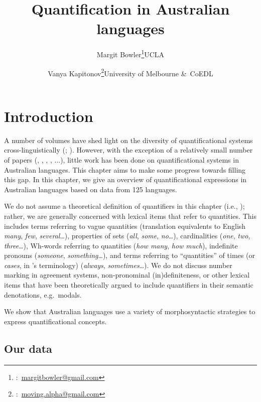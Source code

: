 \documentclass[12pt,egregdoesnotlikesansseriftitles]{scrartcl}
\title{Quantification in Australian languages}
\author{Margit Bowler\thanks{\Letter:~\href{mailto:margitbowler@gmail.com}{margitbowler@gmail.com}}\authorcr UCLA \and \vspace{-.5cm}Vanya Kapitonov\thanks{\Letter:~\href{mailto:moving.alpha@gmail.com}{moving.alpha@gmail.com}}\authorcr University of Melbourne \&\ CoEDL}
\begin{document}
\maketitle

\section{Introduction}

A number of volumes have shed light on the diversity of quantificational systems cross-linguistically (\citealt{keenanpaperno17,keenanpaperno12}; \citealt{bachetal95}). However, with the exception of a relatively small number of papers (\citealt{bowler17}, \citealt{bowernzentz12}, \citealt{bittnerhale95}, \citealt{evans95}, \citealt{laughren81}...), little work has been done on quantificational systems in Australian languages. This chapter aims to make some progress towards filling this gap. In this chapter, we give an overview of quantificational expressions in Australian languages based on data from 125 languages.

We do not assume a theoretical definition of quantifiers in this chapter (i.e., \citealt{heimkratzer98}); rather, we are generally concerned with lexical items that refer to quantities. This includes terms referring to vague quantities (translation equivalents to English \textit{many}, \textit{few}, \textit{several}\ldots), properties of sets (\textit{all}, \textit{some}, \textit{no}\ldots), cardinalities (\textit{one}, \textit{two}, \textit{three}\ldots), Wh-words referring to quantities (\textit{how many}, \textit{how much}), indefinite pronouns (\textit{someone}, \textit{something}\ldots), and terms referring to ``quantities'' of times (or \textit{cases}, in \citealt{lewis75}'s terminology) (\textit{always}, \textit{sometimes}\ldots). We do not discuss number marking in agreement systems, non-pronominal (in)definiteness, or other lexical items that have been theoretically argued to include quantifiers in their semantic denotations, e.g.\ modals.

We show that Australian languages use a variety of morphosyntactic strategies to express quantificational concepts.

\subsection{Our data}

\end{document}
